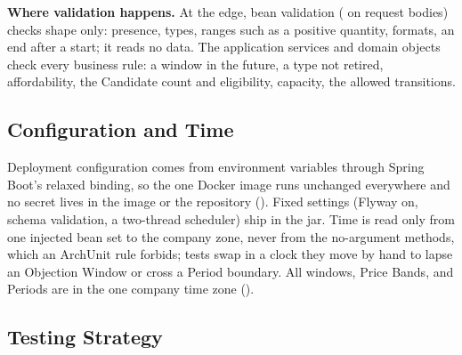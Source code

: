 \textbf{Where validation happens.} At the edge, bean validation ( on request bodies) checks shape only: presence, types, ranges such as a positive quantity, formats, an end after a start; it reads no data. The application services and domain objects check every business rule: a window in the future, a type not retired, affordability, the Candidate count and eligibility, capacity, the allowed transitions.

\subsection{Configuration and Time}

Deployment configuration comes from environment variables through Spring Boot's relaxed binding, so the one Docker image runs unchanged everywhere and no secret lives in the image or the repository (). Fixed settings (Flyway on, schema validation, a two-thread scheduler) ship in the jar. Time is read only from one injected  bean set to the company zone, never from the no-argument  methods, which an ArchUnit rule forbids; tests swap in a clock they move by hand to lapse an Objection Window or cross a Period boundary. All windows, Price Bands, and Periods are in the one company time zone ().

\subsection{Testing Strategy}

